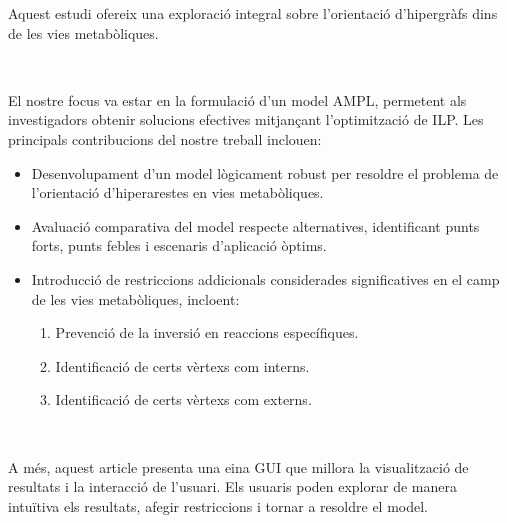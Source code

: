 Aquest estudi ofereix una exploració integral sobre l'orientació d'hipergràfs dins de les vies metabòliques.

~

El nostre focus va estar en la formulació d'un model AMPL, permetent als investigadors obtenir solucions efectives mitjançant l'optimització de ILP. Les principals contribucions del nostre treball inclouen:

\begin{itemize}
\item Desenvolupament d'un model lògicament robust per resoldre el problema de l'orientació d'hiperarestes en vies metabòliques.
\item Avaluació comparativa del model respecte alternatives, identificant punts forts, punts febles i escenaris d'aplicació òptims.
\item Introducció de restriccions addicionals considerades significatives en el camp de les vies metabòliques, incloent:
\begin{enumerate}[left=2em]
\item Prevenció de la inversió en reaccions específiques.
\item Identificació de certs vèrtexs com interns.
\item Identificació de certs vèrtexs com externs.
\end{enumerate}
\end{itemize}

~

A més, aquest article presenta una eina GUI que millora la visualització de resultats i la interacció de l'usuari. Els usuaris poden explorar de manera intuïtiva els resultats, afegir restriccions i tornar a resoldre el model.
